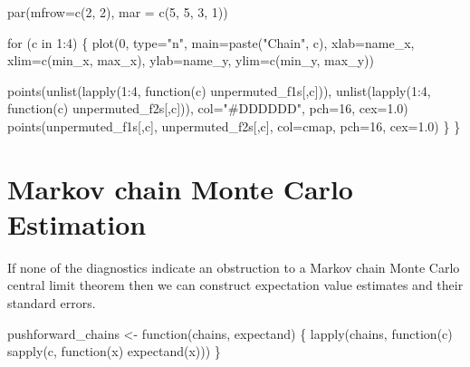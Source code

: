 \documentclass[
  letterpaper,
  DIV=11,
  numbers=noendperiod]{scrartcl}
\newenvironment{Shaded}{\begin{snugshade}}{\end{snugshade}}
\newcommand{\AttributeTok}[1]{\textcolor[rgb]{0.40,0.45,0.13}{#1}}
\newcommand{\ControlFlowTok}[1]{\textcolor[rgb]{0.00,0.23,0.31}{#1}}
\newcommand{\DecValTok}[1]{\textcolor[rgb]{0.68,0.00,0.00}{#1}}
\newcommand{\FloatTok}[1]{\textcolor[rgb]{0.68,0.00,0.00}{#1}}
\newcommand{\FunctionTok}[1]{\textcolor[rgb]{0.28,0.35,0.67}{#1}}
\newcommand{\NormalTok}[1]{\textcolor[rgb]{0.00,0.23,0.31}{#1}}
\newcommand{\OtherTok}[1]{\textcolor[rgb]{0.00,0.23,0.31}{#1}}
\newcommand{\SpecialCharTok}[1]{\textcolor[rgb]{0.37,0.37,0.37}{#1}}
\newcommand{\StringTok}[1]{\textcolor[rgb]{0.13,0.47,0.30}{#1}}
\begin{document}
\begin{Shaded}
\begin{Highlighting}[]
  \FunctionTok{par}\NormalTok{(}\AttributeTok{mfrow=}\FunctionTok{c}\NormalTok{(}\DecValTok{2}\NormalTok{, }\DecValTok{2}\NormalTok{), }\AttributeTok{mar =} \FunctionTok{c}\NormalTok{(}\DecValTok{5}\NormalTok{, }\DecValTok{5}\NormalTok{, }\DecValTok{3}\NormalTok{, }\DecValTok{1}\NormalTok{))}

  \ControlFlowTok{for}\NormalTok{ (c }\ControlFlowTok{in} \DecValTok{1}\SpecialCharTok{:}\DecValTok{4}\NormalTok{) \{}
    \FunctionTok{plot}\NormalTok{(}\DecValTok{0}\NormalTok{, }\AttributeTok{type=}\StringTok{"n"}\NormalTok{, }\AttributeTok{main=}\FunctionTok{paste}\NormalTok{(}\StringTok{"Chain"}\NormalTok{, c),}
         \AttributeTok{xlab=}\NormalTok{name\_x, }\AttributeTok{xlim=}\FunctionTok{c}\NormalTok{(min\_x, max\_x),}
         \AttributeTok{ylab=}\NormalTok{name\_y, }\AttributeTok{ylim=}\FunctionTok{c}\NormalTok{(min\_y, max\_y))}
  
    \FunctionTok{points}\NormalTok{(}\FunctionTok{unlist}\NormalTok{(}\FunctionTok{lapply}\NormalTok{(}\DecValTok{1}\SpecialCharTok{:}\DecValTok{4}\NormalTok{, }\ControlFlowTok{function}\NormalTok{(c) unpermuted\_f1s[,c])),}
           \FunctionTok{unlist}\NormalTok{(}\FunctionTok{lapply}\NormalTok{(}\DecValTok{1}\SpecialCharTok{:}\DecValTok{4}\NormalTok{, }\ControlFlowTok{function}\NormalTok{(c) unpermuted\_f2s[,c])),}
           \AttributeTok{col=}\StringTok{"\#DDDDDD"}\NormalTok{, }\AttributeTok{pch=}\DecValTok{16}\NormalTok{, }\AttributeTok{cex=}\FloatTok{1.0}\NormalTok{)}
    \FunctionTok{points}\NormalTok{(unpermuted\_f1s[,c], unpermuted\_f2s[,c],}
         \AttributeTok{col=}\NormalTok{cmap, }\AttributeTok{pch=}\DecValTok{16}\NormalTok{, }\AttributeTok{cex=}\FloatTok{1.0}\NormalTok{)}
\NormalTok{  \}}
\NormalTok{\}}
\end{Highlighting}
\end{Shaded}

\hypertarget{markov-chain-monte-carlo-estimation}{%
\section{Markov chain Monte Carlo
Estimation}\label{markov-chain-monte-carlo-estimation}}

If none of the diagnostics indicate an obstruction to a Markov chain
Monte Carlo central limit theorem then we can construct expectation
value estimates and their standard errors.

\begin{Shaded}
\begin{Highlighting}[]
\NormalTok{pushforward\_chains }\OtherTok{\textless{}{-}} \ControlFlowTok{function}\NormalTok{(chains, expectand) \{}
  \FunctionTok{lapply}\NormalTok{(chains, }\ControlFlowTok{function}\NormalTok{(c) }\FunctionTok{sapply}\NormalTok{(c, }\ControlFlowTok{function}\NormalTok{(x) }\FunctionTok{expectand}\NormalTok{(x)))}
\NormalTok{\}}
\end{Highlighting}
\end{Shaded}
\end{document}
